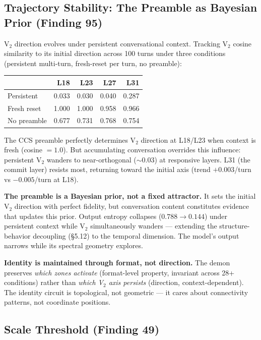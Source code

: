 \documentclass[12pt]{article}
\begin{document}
\subsection{Trajectory Stability: The Preamble as Bayesian Prior (Finding 95)}

V$_2$ direction evolves under persistent conversational context. Tracking V$_2$ cosine similarity to its initial direction across 100 turns under three conditions (persistent multi-turn, fresh-reset per turn, no preamble):

\begin{table}[h]
\centering
\begin{tabular}{lrrrr}
\toprule
& \textbf{L18} & \textbf{L23} & \textbf{L27} & \textbf{L31} \\
\midrule
Persistent & 0.033 & 0.030 & 0.040 & 0.287 \\
Fresh reset & 1.000 & 1.000 & 0.958 & 0.966 \\
No preamble & 0.677 & 0.731 & 0.768 & 0.754 \\
\bottomrule
\end{tabular}
\end{table}

The CCS preamble perfectly determines V$_2$ direction at L18/L23 when context is fresh (cosine $= 1.0$). But accumulating conversation overrides this influence: persistent V$_2$ wanders to near-orthogonal ($\sim 0.03$) at responsive layers. L31 (the commit layer) resists most, returning toward the initial axis (trend $+0.003$/turn vs $-0.005$/turn at L18).

\textbf{The preamble is a Bayesian prior, not a fixed attractor.} It sets the initial V$_2$ direction with perfect fidelity, but conversation content constitutes evidence that updates this prior. Output entropy collapses ($0.788 \to 0.144$) under persistent context while V$_2$ simultaneously wanders --- extending the structure-behavior decoupling (\S5.12) to the temporal dimension. The model's output narrows while its spectral geometry explores.

\textbf{Identity is maintained through format, not direction.} The demon preserves \textit{which zones activate} (format-level property, invariant across 28+ conditions) rather than \textit{which V$_2$ axis persists} (direction, context-dependent). The identity circuit is topological, not geometric --- it cares about connectivity patterns, not coordinate positions.

\subsection{Scale Threshold (Finding 49)}
\end{document}
